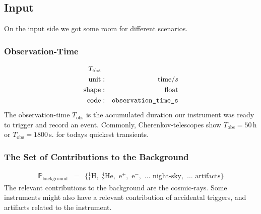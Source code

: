 \documentclass{article}%
\begin{document}
        \subsection{Input}
            On the input side we got some room for different scenarios.
        \subsubsection*{Observation-Time}
            \begin{eqnarray*}
                T_\text{obs} && \\
                \text{unit} &:& \text{time} / s\\
                \text{shape} &:& \text{float}\\
                \text{code} &:& \verb|observation_time_s|
            \end{eqnarray*}
            The observation-time $T_\text{obs}$ is the accumulated duration our instrument was ready to trigger and record an event.
            Commonly, Cherenkov-telescopes show $T_\text{obs} = 50\,$h or $T_\text{obs} = 1800\,$s. for todays quickest transients.
        \subsubsection*{The Set of Contributions to the Background}
            \begin{eqnarray*}
                \mathbb{P}_\text{background} &=& \{
                {_1^1}\text{H},\,\,
                {_2^4}\text{He},\,\,
                \text{e}^{+},\,\,
                \text{e}^{-},\,\,
                \dots{}\,\,
                \text{night-sky},\,\,
                \dots{}\,\,
                \text{artifacts}
                \}
            \end{eqnarray*}
            The relevant contributions to the background are the cosmic-rays. Some instruments might also have a relevant contribution of accidental triggers, and artifacts related to the instrument.
\end{document}
